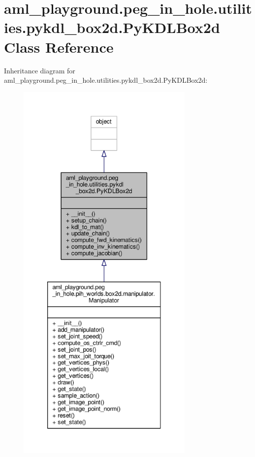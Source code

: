 \hypertarget{classaml__playground_1_1peg__in__hole_1_1utilities_1_1pykdl__box2d_1_1_py_k_d_l_box2d}{\section{aml\-\_\-playground.\-peg\-\_\-in\-\_\-hole.\-utilities.\-pykdl\-\_\-box2d.\-Py\-K\-D\-L\-Box2d Class Reference}
\label{classaml__playground_1_1peg__in__hole_1_1utilities_1_1pykdl__box2d_1_1_py_k_d_l_box2d}
}


Inheritance diagram for aml\-\_\-playground.\-peg\-\_\-in\-\_\-hole.\-utilities.\-pykdl\-\_\-box2d.\-Py\-K\-D\-L\-Box2d\-:\nopagebreak
\begin{figure}[H]
\begin{center}
\leavevmode
\includegraphics[height=550pt]{classaml__playground_1_1peg__in__hole_1_1utilities_1_1pykdl__box2d_1_1_py_k_d_l_box2d__inherit__graph}
\end{center}
\end{figure}


